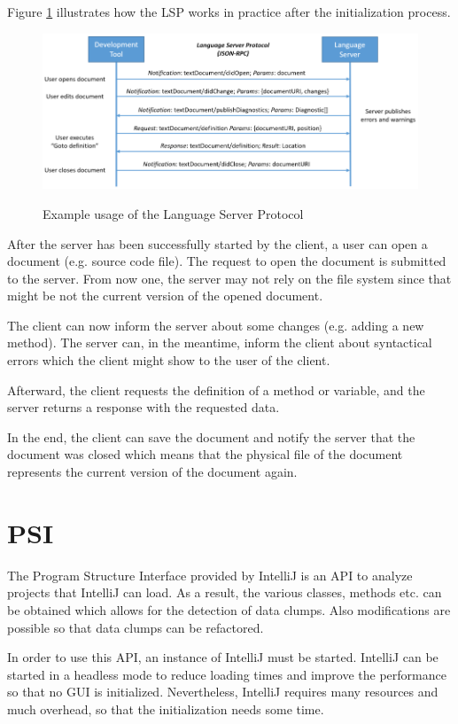Figure \ref{fig:lsp_usage} illustrates how the \ac{LSP} works in practice after the initialization process. 
\begin{figure}
    \centering
    \includegraphics{figures/chapter2/language-server-sequence.png}
    \caption{Example usage of the Language Server Protocol}
    \label{fig:lsp_usage}
    \cite{lsp_website}
\end{figure}

After the server has been successfully started by the client, a user can open a document (e.g. source code file). The request to open the document is submitted to the server. From now one, the server may not rely on the file system since that might be not the current version of the opened document. 

The client can now inform the server about some changes (e.g. adding a new method). The server can, in the meantime, inform the client about syntactical errors which the client might show to the user of the client.

Afterward, the client requests the definition of a method or variable, and the server returns a response with the requested data.

In the end, the client can save the document and notify the server that the document was closed which means that the physical file of the document represents the current version of the document again. 


\section{PSI}\label{sec:psi}
The Program Structure Interface provided by IntelliJ is an \ac{API} to analyze projects that IntelliJ can load. As a result, the various classes, methods etc. can be obtained which allows for the detection of data clumps. Also modifications are possible so that data clumps can be refactored.

In order to use this API, an instance of IntelliJ must be started. IntelliJ can be started in a headless mode to reduce loading times and improve the performance so that no GUI is initialized. Nevertheless, IntelliJ requires many resources and much overhead, so that  the initialization needs some time.



